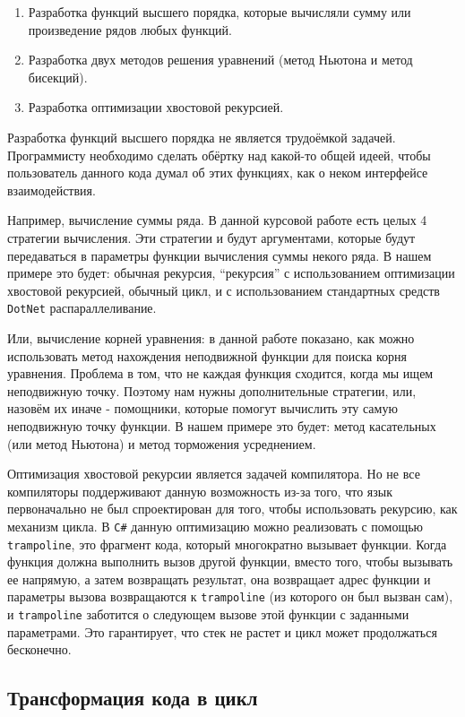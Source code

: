 \begin{enumerate}
	\item Разработка функций высшего порядка, которые вычисляли сумму или произведение рядов любых функций.
	\item Разработка двух методов решения уравнений (метод Ньютона и метод бисекций).
	\item Разработка оптимизации хвостовой рекурсией.
\end{enumerate}

Разработка функций высшего порядка не является трудоёмкой задачей. 
Программисту необходимо сделать обёртку над какой-то общей идеей, чтобы пользователь данного кода думал об этих функциях, как о неком интерфейсе взаимодействия.

Например, вычисление суммы ряда. В данной курсовой работе есть целых 4 стратегии вычисления. Эти стратегии и будут аргументами, которые будут передаваться в параметры функции вычисления суммы некого ряда.
В нашем примере это будет: обычная рекурсия, ``рекурсия'' с использованием оптимизации хвостовой рекурсией, обычный цикл, и с использованием стандартных средств \texttt{DotNet} распараллеливание.

Или, вычисление корней уравнения: в данной работе показано, как можно использовать метод нахождения неподвижной функции для поиска корня уравнения.
Проблема в том, что не каждая функция сходится, когда мы ищем неподвижную точку.
Поэтому нам нужны дополнительные стратегии, или, назовём их иначе - помощники, которые помогут вычислить эту самую неподвижную точку функции.
В нашем примере это будет: метод касательных (или метод Ньютона) и метод торможения усреднением.

Оптимизация хвостовой рекурсии является задачей компилятора.
Но не все компиляторы поддерживают данную возможность из-за того, что язык первоначально не был спроектирован для того, чтобы использовать рекурсию, как механизм цикла.
В \texttt{C\#} данную оптимизацию можно реализовать с помощью \texttt{trampoline}, это фрагмент кода, который многократно вызывает функции. 
Когда функция должна выполнить вызов другой функции, вместо того, чтобы вызывать ее напрямую, а затем возвращать результат, она возвращает адрес функции и параметры вызова возвращаются к \texttt{trampoline} (из которого он был вызван сам), и \texttt{trampoline} заботится о следующем вызове этой функции с заданными параметрами. Это гарантирует, что стек не растет и цикл может продолжаться бесконечно.

\subsection{Трансформация кода в цикл}
\label{transformation}

